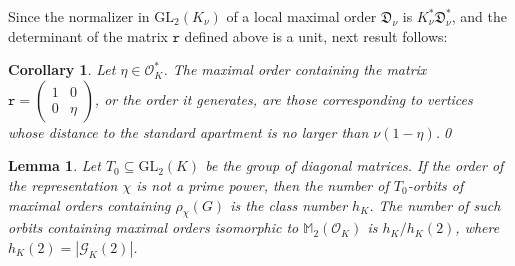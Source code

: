 \documentclass{article}
\newtheorem{Lem}[Prop]{Lemma}
\newtheorem{Cor}{Corollary}[Prop]
\theoremstyle{definition}
\theoremstyle{remark}
\begin{document}
Since the normalizer in $\mathrm{GL}_2(K_\nu)$ 
of a local maximal order
$\mathfrak{D}_\nu$ is $K_\nu^*\mathfrak{D}_\nu^*$, 
and the determinant
of the matrix $\mathtt{r}$ defined above is a unit, 
next result follows:

\begin{Cor}\label{cl61}
    Let $\eta \in \mathcal{O}_K^* $. The maximal order containing the matrix
    $\mathtt{r}=\begin{pmatrix} 1&0\\0&\eta \end{pmatrix}$,
    or the order it generates, are those corresponding to
    vertices whose distance to the standard apartment is no larger
    than $\nu(1-\eta )$.\qed
\end{Cor}

\begin{Lem}\label{l62}
    Let $T_0\subseteq\mathrm{GL}_2(K)$ be the group of diagonal matrices.
    If the order of the representation $\chi$ is not a prime power,
    then the number of $T_0$-orbits of maximal orders containing 
    $\rho_\chi(G)$ is the class number $h_K$. The number of such 
    orbits containing maximal orders isomorphic to
    $\mathbb{M}_2(\mathcal{O}_K)$ is $h_K/h_K(2)$, where
    $h_K(2)=|\mathcal{G}_K(2)|$.
\end{Lem}
\end{document}
